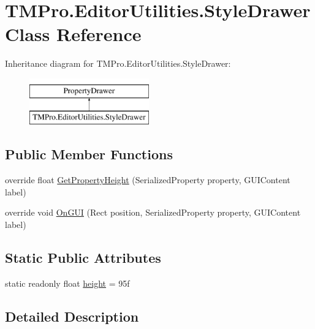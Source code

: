 \hypertarget{class_t_m_pro_1_1_editor_utilities_1_1_style_drawer}{}\section{T\+M\+Pro.\+Editor\+Utilities.\+Style\+Drawer Class Reference}
\label{class_t_m_pro_1_1_editor_utilities_1_1_style_drawer}
Inheritance diagram for T\+M\+Pro.\+Editor\+Utilities.\+Style\+Drawer\+:\begin{figure}[H]
\begin{center}
\leavevmode
\includegraphics[height=2.000000cm]{class_t_m_pro_1_1_editor_utilities_1_1_style_drawer}
\end{center}
\end{figure}
\subsection*{Public Member Functions}
\begin{DoxyCompactItemize}
\item 
override float \mbox{\hyperlink{class_t_m_pro_1_1_editor_utilities_1_1_style_drawer_a1dade7a00c8cfd28ebbdfd5bb86b785a}{Get\+Property\+Height}} (Serialized\+Property property, G\+U\+I\+Content label)
\item 
override void \mbox{\hyperlink{class_t_m_pro_1_1_editor_utilities_1_1_style_drawer_abcf27ef490de61d446ea0a1b35f3da98}{On\+G\+UI}} (Rect position, Serialized\+Property property, G\+U\+I\+Content label)
\end{DoxyCompactItemize}
\subsection*{Static Public Attributes}
\begin{DoxyCompactItemize}
\item 
static readonly float \mbox{\hyperlink{class_t_m_pro_1_1_editor_utilities_1_1_style_drawer_a73943e0e343bf68f7476b0572466052d}{height}} = 95f
\end{DoxyCompactItemize}


\subsection{Detailed Description}


